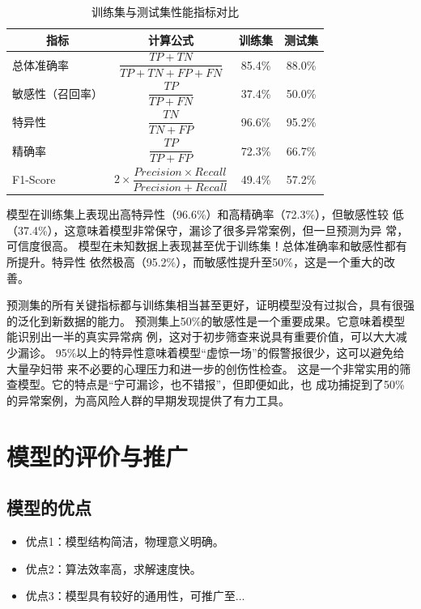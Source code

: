 \documentclass[withoutpreface,notoc]{cumcmthesis}
\begin{document}
	\begin{table}[H]
	\centering
	\caption{训练集与测试集性能指标对比}
	\label{训练集与测试集性能指标对比}
	\renewcommand{\arraystretch}{2.2} %
		\begin{tabular}{|l|c|c|c|}
		\hline
		\multicolumn{1}{|c|}{\textbf{指标}} & \multicolumn{1}{c|}{\textbf{计算公式}} & \multicolumn{1}{c|}{\textbf{训练集}} & \multicolumn{1}{c|}{\textbf{测试集}} \\ 
		\hline
		总体准确率 & $\dfrac{TP + TN}{TP + TN + FP + FN}$ & 85.4\% & 88.0\% \\ 
		\hline
		敏感性（召回率） & $\dfrac{TP}{TP + FN}$ & 37.4\% & 50.0\% \\ 
		\hline
		特异性 & $\dfrac{TN}{TN + FP}$ & 96.6\% & 95.2\% \\ 
		\hline
		精确率 & $\dfrac{TP}{TP + FP}$ & 72.3\% & 66.7\% \\ 
		\hline
		F1-Score & $2 \times \dfrac{Precision \times Recall}{Precision + Recall}$ & 49.4\% & 57.2\% \\ 
		\hline
		\end{tabular}
	\end{table}

	模型在训练集上表现出高特异性（96.6\%）和高精确率（72.3\%），但敏感性较
	低（37.4\%），这意味着模型非常保守，漏诊了很多异常案例，但一旦预测为异
	常，可信度很高。
	模型在未知数据上表现甚至优于训练集！总体准确率和敏感性都有所提升。特异性
	依然极高（95.2\%），而敏感性提升至50\%，这是一个重大的改善。

	预测集的所有关键指标都与训练集相当甚至更好，证明模型没有过拟合，具有很强
	的泛化到新数据的能力。
	预测集上50\%的敏感性是一个重要成果。它意味着模型能识别出一半的真实异常病
	例，这对于初步筛查来说具有重要价值，可以大大减少漏诊。
	95\%以上的特异性意味着模型“虚惊一场”的假警报很少，这可以避免给大量孕妇带
	来不必要的心理压力和进一步的创伤性检查。
	这是一个非常实用的筛查模型。它的特点是“宁可漏诊，也不错报”，但即便如此，也
	成功捕捉到了50\%的异常案例，为高风险人群的早期发现提供了有力工具。








	

	\section{模型的评价与推广}
	\subsection{模型的优点}
	\begin{itemize}[itemindent=2em]
		\item 优点1：模型结构简洁，物理意义明确。
		\item 优点2：算法效率高，求解速度快。
		\item 优点3：模型具有较好的通用性，可推广至...
	\end{itemize}
\end{document}
